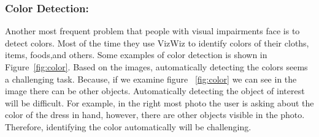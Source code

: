 \documentclass[sigconf]{acmart}
\begin{document}
\subsubsection{Color Detection:} Another most frequent problem that people with visual impairments face is to detect colors. Most of the time they use VizWiz to identify colors of their cloths, items, foods,and others. Some examples of color detection is shown in Figure~\ref{fig:color}.  Based on the images, automatically detecting the colors seems a challenging task. Because, if we examine figure ~\ref{fig:color} we can see in the image there can be other objects. Automatically detecting the object of interest will be difficult. For example, in the right most photo the user is asking about the color of the dress in hand, however, there are other objects  visible in the photo. Therefore, identifying the color automatically will be challenging. 
\end{document}
